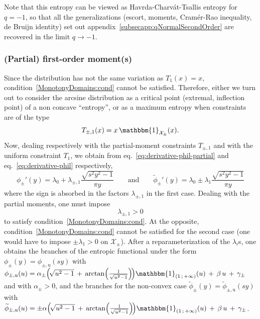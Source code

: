 \documentclass[entropy,article,submit,moreauthors,pdftex]{Definitions/mdpi}
\def\X{\mathcal{X}}%
\def\un{\mathbbm{1}}%
\def\u{\mathrm{u}}
\begin{document}
Note that this entropy can be  viewed as Havrda-Charv\'at-Tsallis entropy for $q
=  -1$,  so   that  all  the  generalizations   (escort,  moments,  Cram\'er-Rao
inequality,         de         Bruijn          identity)         set         out
appendix~\ref{subsecapp:qNormalSecondOrder} are  recovered in  the limit  $q \to
-1$.



\subsubsection{(Partial) first-order moment(s)}
\label{subsubsecapp:ArcsineFirstPartial}

Since  the   distribution  has  not  the   same  variation  as  $T_1(x)   =  x$,
condition~\ref{MonotonyDomains:cond}  cannot be  satisfied. Therefore,  either we
turn out  to consider the  arcsine distribution  as a critical  point (extremal,
inflection point)  of a non  concave ``entropy'', or  as a maximum  entropy when
constraints are of the type
%
\[
T_{\pm,1}(x) = x \, \un_{\X_\pm}(x).
\]
%
Now, dealing  respectively with  the partial-moment constraints  $T_{\pm,1}$ and
with     the      uniform     constraint      $T_1$,     we      obtain     from
eq.~\eqref{eq:derivative-phil-partial}     and    eq.~\eqref{eq:derivative-phil}
respectively,
%
\[
\phi_\pm'(y)  = \lambda_0  + \lambda_{\pm,1}  \frac{\sqrt{s^2 y^2  - 1}}{\pi  y}
\qquad  \mbox{and} \qquad  \widetilde{\phi}_\pm'(y)  =  \lambda_0 \pm  \lambda_1
\frac{\sqrt{s^2 y^2 - 1}}{\pi y}
\]
%
where the sign  is absorbed in the factors $\lambda_{\pm,1}$  in the first case.
Dealing with  the partial moments,  one must  impose $$\lambda_{\pm,1} >  0$$ to
satisfy     condition~\ref{MonotonyDomains:cond}.       At     the     opposite,
condition~\ref{MonotonyDomains:cond}  cannot be  satisfied for  the second  case
(one  would  have  to  impose  $\pm  \lambda_1  >  0$  on  $\X_\pm$).   After  a
reparameterization of the $\lambda_i$s, one obtains the branches of the entropic
functional   under   the   form   $\phi_\pm(y)  =   \phi_{\pm,\u}(s   y)$   with
$\phi_{\pm,\u}(u) = \alpha_\pm  \left( \!  \sqrt{u^2 - 1} \,  + \, \arctan\left(
\frac{1}{\sqrt{u^2  - 1}}  \right) \!   \right) \un_{\left(  1 \,  ; \,  +\infty
  \right)}(u) \, + \, \beta \, u \,  + \, \gamma_\pm$ and with $\alpha_\pm > 0$,
and   the  branches   for   the  non-convex   case  $\widetilde{\phi}_\pm(y)   =
\widetilde{\phi}_{\pm,\u}(s y)$ with  $\widetilde{\phi}_{\pm,\u}(u) = \pm \alpha
\left( \! \sqrt{u^2 - 1} \,  + \, \arctan\left( \frac{1}{\sqrt{u^2 - 1}} \right)
\! \right) \un_{\left( 1 \, ; \, +\infty \right)}(u)  \, + \, \beta \, u \, + \,
\gamma_\pm$.
\end{document}

